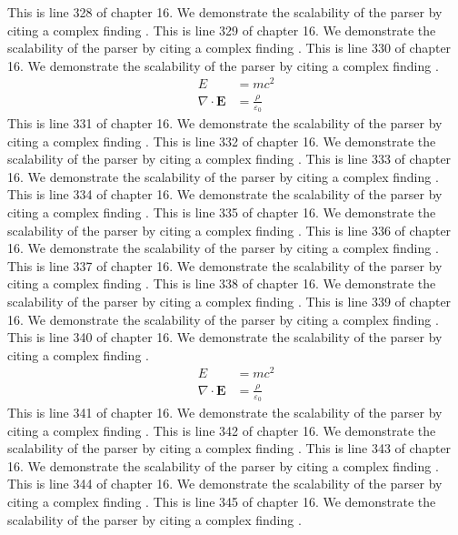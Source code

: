 This is line 328 of chapter 16. We demonstrate the scalability of the parser by citing a complex finding \cite{ref16_328}.
This is line 329 of chapter 16. We demonstrate the scalability of the parser by citing a complex finding \cite{ref16_329}.
This is line 330 of chapter 16. We demonstrate the scalability of the parser by citing a complex finding \cite{ref16_330}.
\begin{align*}
  E &= mc^2 \\
  \nabla \cdot \mathbf{E} &= \frac{\rho}{\varepsilon_0}
\end{align*}
This is line 331 of chapter 16. We demonstrate the scalability of the parser by citing a complex finding \cite{ref16_331}.
This is line 332 of chapter 16. We demonstrate the scalability of the parser by citing a complex finding \cite{ref16_332}.
This is line 333 of chapter 16. We demonstrate the scalability of the parser by citing a complex finding \cite{ref16_333}.
This is line 334 of chapter 16. We demonstrate the scalability of the parser by citing a complex finding \cite{ref16_334}.
This is line 335 of chapter 16. We demonstrate the scalability of the parser by citing a complex finding \cite{ref16_335}.
This is line 336 of chapter 16. We demonstrate the scalability of the parser by citing a complex finding \cite{ref16_336}.
This is line 337 of chapter 16. We demonstrate the scalability of the parser by citing a complex finding \cite{ref16_337}.
This is line 338 of chapter 16. We demonstrate the scalability of the parser by citing a complex finding \cite{ref16_338}.
This is line 339 of chapter 16. We demonstrate the scalability of the parser by citing a complex finding \cite{ref16_339}.
This is line 340 of chapter 16. We demonstrate the scalability of the parser by citing a complex finding \cite{ref16_340}.
\begin{align*}
  E &= mc^2 \\
  \nabla \cdot \mathbf{E} &= \frac{\rho}{\varepsilon_0}
\end{align*}
This is line 341 of chapter 16. We demonstrate the scalability of the parser by citing a complex finding \cite{ref16_341}.
This is line 342 of chapter 16. We demonstrate the scalability of the parser by citing a complex finding \cite{ref16_342}.
This is line 343 of chapter 16. We demonstrate the scalability of the parser by citing a complex finding \cite{ref16_343}.
This is line 344 of chapter 16. We demonstrate the scalability of the parser by citing a complex finding \cite{ref16_344}.
This is line 345 of chapter 16. We demonstrate the scalability of the parser by citing a complex finding \cite{ref16_345}.
